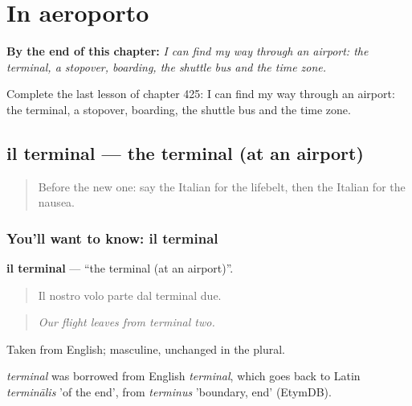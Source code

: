
\chapter{In aeroporto}
\label{ch:it-in-aeroporto}

\begin{chapteropening}
\textbf{By the end of this chapter:} \emph{I can find my way through an airport: the terminal, a stopover, boarding, the shuttle bus and the time zone.}

Complete the last lesson of chapter 425: I can find my way through an airport: the terminal, a stopover, boarding, the shuttle bus and the time zone.
\end{chapteropening}

\section[il terminal]{il terminal — the terminal (at an airport)}

\label{lesson:IT-C425-terminal}



\begin{quote}
Before the new one: say the Italian for the lifebelt, then the Italian for the nausea.
\end{quote}

\subsection*{You'll want to know: il terminal}
\textbf{il terminal} — \textquotedblleft{}the terminal (at an airport)\textquotedblright{}.

\begin{quote}
Il nostro volo parte dal terminal due.
\end{quote}

\begin{quote}
\emph{Our flight leaves from terminal two.}
\end{quote}

Taken from English; masculine, unchanged in the plural.

\begin{cousinweb}
\emph{terminal} was borrowed from English \emph{terminal}, which goes back to Latin \emph{terminālis} 'of the end', from \emph{terminus} 'boundary, end' (EtymDB).
\end{cousinweb}

